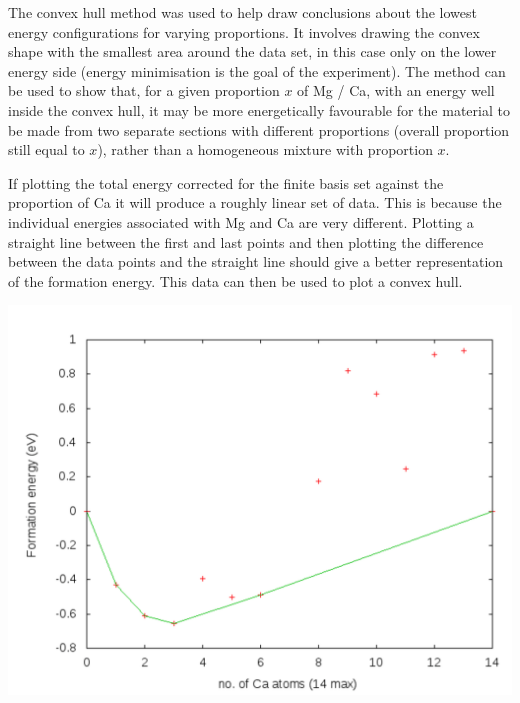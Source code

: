 \documentclass[a4paper,12pt]{article}
\begin{document}
\begin{multicols}{2}
	The convex hull method\cite{jarvis1973identification} was used to help draw conclusions about the lowest energy configurations for varying proportions. It involves drawing the convex shape with the smallest area around the data set, in this case only on the lower energy side (energy minimisation is the goal of the experiment). The method can be used to show that, for a given proportion $x$ of Mg / Ca, with an energy well inside the convex hull, it may be more energetically favourable for the material to be made from two separate sections with different proportions (overall proportion still equal to $x$), rather than a homogeneous mixture with proportion $x$.
	
	If plotting the total energy corrected for the finite basis set against the proportion of Ca it will produce a roughly linear set of data. This is because the individual energies associated with Mg and Ca are very different. Plotting a straight line between the first and last points and then plotting the difference between the data points and the straight line should give a better representation of the formation energy. This data can then be used to plot a convex hull.
	
    \begin{center}
	    \includegraphics[keepaspectratio=true,scale=0.33]{convex}
			\label{fig:convex} 
	\end{center}


\end{multicols}
\end{document}
